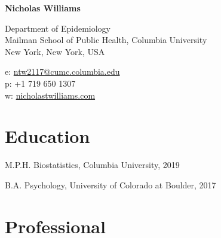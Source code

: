 \documentclass[12pt,letterpaper]{report}
\newcommand{\myname}{Nicholas Williams}
\newcommand{\namefont}[1]{{\normalfont\bfseries\Huge{#1}}}
\begin{document}
    \raggedright

    \namefont{\myname}

    \vspace{1em}
    \begin{minipage}[t]{0.64\textwidth}
        Department of Epidemiology \\
        Mailman School of Public Health, Columbia University
        \\ New York, New York, USA
    \end{minipage}
    \begin{minipage}[t]{0.34\textwidth}
        e: \href{mailto:ntw2117@cumc.columbia.edu}{ntw2117@cumc.columbia.edu} \\
        p: +1 719 650 1307 \\
        w: \href{https://nicholastwilliams.com/}{nicholastwilliams.com}
    \end{minipage}
    \vspace{0.5em}

    \section*{Education}

    \begin{tablist}

        \item[M.P.H.]  \tab Biostatistics, Columbia University, 2019

        \item[B.A.]  \tab Psychology, University of Colorado at Boulder, 2017

    \end{tablist}

    \section*{Professional}
\end{document}
